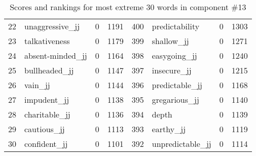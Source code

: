 \begin{table}[tbp]
\begin{tabular}{| rlr@{.}l | rlr@{.}l |}
    22 & unaggressive\_jj & 0 & 1191    &    400 & predictability & 0 & 1303 \\
    23 & talkativeness & 0 & 1179    &    399 & shallow\_jj & 0 & 1271 \\
    24 & absent-minded\_jj & 0 & 1164    &    398 & easygoing\_jj & 0 & 1240 \\
    25 & bullheaded\_jj & 0 & 1147    &    397 & insecure\_jj & 0 & 1215 \\
    26 & vain\_jj & 0 & 1144    &    396 & predictable\_jj & 0 & 1168 \\
    27 & impudent\_jj & 0 & 1138    &    395 & gregarious\_jj & 0 & 1140 \\
    28 & charitable\_jj & 0 & 1136    &    394 & depth & 0 & 1139 \\
    29 & cautious\_jj & 0 & 1113    &    393 & earthy\_jj & 0 & 1119 \\
    30 & confident\_jj & 0 & 1101    &    392 & unpredictable\_jj & 0 & 1114 \\
    \hline
    \end{tabular}
    \caption{Scores and rankings for most extreme 30 words in component \#13} 
\end{table}
\clearpage
